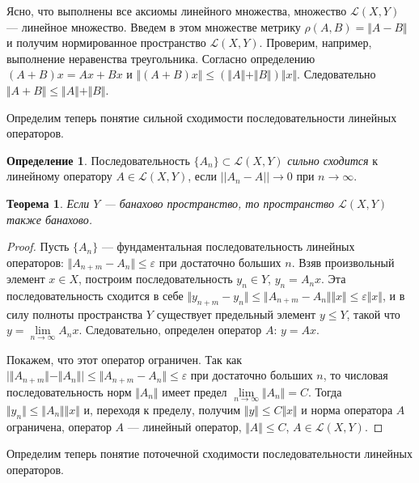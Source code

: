 \documentclass[12pt,a4paper,titlepage,oneside]{book}
\theoremstyle{definition}
\newtheorem*{definition}{Определение}
\theoremstyle{plain}
\newtheorem*{theorem}{Теорема}
\theoremstyle{break}
\theoremstyle{remark}
\theoremstyle{remark}
\theoremstyle{remark}
\theoremstyle{remark}
\theoremstyle{plain}
\theoremstyle{plain}
\begin{document}
Ясно, что выполнены все аксиомы линейного множества, множество $\mathcal{L}(X,Y)$ --- линейное множество. Введем в этом множестве метрику $\rho(A, B) = \Vert A-B \Vert$ и получим нормированное пространство $\mathcal{L}(X,Y)$. Проверим, например, выполнение неравенства треугольника. Согласно определению $(A+B)x = Ax+Bx$ и $\Vert(A+B)x\Vert\le(\Vert A\Vert+\Vert B\Vert)\Vert x\Vert$. Следовательно $\Vert A+B\Vert\le\Vert A\Vert+\Vert B\Vert$.

Определим теперь понятие сильной сходимости последовательности линейных операторов.

\begin{definition}
Последовательность $\{A_n\} \subset \mathcal{L}(X,Y)$ \textit{сильно сходится} к линейному оператору $A\in \mathcal{L}(X,Y)$, если $||A_n-A||\to 0$ при $n\to {\infty}$.
\end{definition}

\begin{theorem}
Если $Y$ --- банахово пространство, то пространство $\mathcal{L}(X,Y)$ также банахово.
\end{theorem}

\begin{proof}
Пусть $\{A_n\}$ --- фундаментальная последовательность линейных операторов: $\Vert A_{n+m} - A_n \Vert\le \varepsilon$ при достаточно больших $n$. Взяв произвольный элемент $x\in X$, построим последовательность $y_n\in Y$, $y_n=A_nx$. Эта последовательность сходится в себе $\Vert y_{n+m}-y_n\Vert\le \Vert A_{n+m}-A_n\Vert \Vert x\Vert\le \varepsilon \Vert x\Vert$, и в силу полноты пространства $Y$ существует предельный элемент $y \leqslant Y$, такой что $y=\lim \limits_{n \to \infty} A_n x$. Следовательно, определен оператор $A$: $y = Ax$.

Покажем, что этот оператор ограничен. Так как $ \big\lvert \Vert A_{n+m} \Vert - \Vert A_n\Vert \big\rvert \leqslant \Vert A_{n+m} - A_n \Vert \leqslant \varepsilon$ при достаточно больших $n$, то числовая последовательность норм $\Vert A_n\Vert$ имеет предел $\lim \limits_{n\to \infty} \Vert A_n\Vert=C$. Тогда $\Vert y_n \Vert \leqslant \Vert A_n\Vert \Vert x\Vert$ и, переходя к пределу, получим $\Vert y \Vert \leqslant C \Vert x \Vert$ и норма оператора $A$ ограничена, оператор $A$ --- линейный оператор, $\Vert A\Vert \leqslant C$, $A \in \mathcal{L}(X,Y)$.
\end{proof}

Определим теперь понятие поточечной сходимости последовательности линейных операторов.
\end{document}
